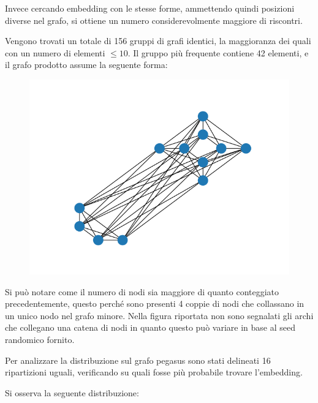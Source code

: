 \documentclass[12pt]{article}
\begin{document}
Invece cercando embedding con le stesse forme, ammettendo quindi posizioni diverse nel grafo, si ottiene un numero considerevolmente maggiore di riscontri.

Vengono trovati un totale di 156 gruppi di grafi identici, la maggioranza dei quali con un numero di elementi $\leq 10$.
Il gruppo più frequente contiene 42 elementi, e il grafo prodotto assume la seguente forma:

\begin{figure}[H]
  \centering
  \includegraphics[width=\linewidth]{img/317.png}
\end{figure}

Si può notare come il numero di nodi sia maggiore di quanto conteggiato precedentemente, questo perché sono presenti 4 coppie di nodi che collassano in un unico nodo nel grafo minore.
Nella figura riportata non sono segnalati gli archi che collegano una catena di nodi in quanto questo può variare in base al seed randomico fornito.

Per analizzare la distribuzione sul grafo pegasus sono stati delineati 16 ripartizioni uguali, 
verificando su quali fosse più probabile trovare l'embedding.

Si osserva la seguente distribuzione:
\end{document}

